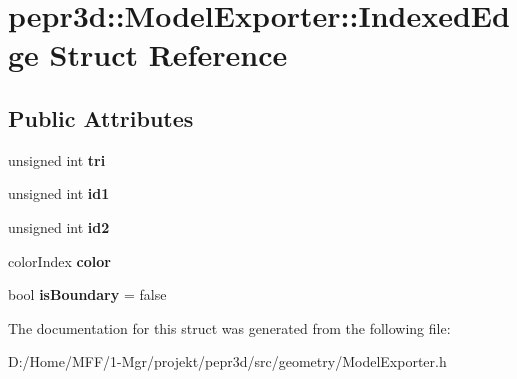 \hypertarget{structpepr3d_1_1_model_exporter_1_1_indexed_edge}{}\section{pepr3d\+::Model\+Exporter\+::Indexed\+Edge Struct Reference}
\label{structpepr3d_1_1_model_exporter_1_1_indexed_edge}
\subsection*{Public Attributes}
\begin{DoxyCompactItemize}
\item 
\mbox{\label{structpepr3d_1_1_model_exporter_1_1_indexed_edge_a96c2ac311bdefbdd05d3d440f6cb7aae}} 
unsigned int {\bfseries tri}
\item 
\mbox{\label{structpepr3d_1_1_model_exporter_1_1_indexed_edge_a6480f84ae4bf23063dcb133b03aac124}} 
unsigned int {\bfseries id1}
\item 
\mbox{\label{structpepr3d_1_1_model_exporter_1_1_indexed_edge_acc7a156af891555d2131eae033e18556}} 
unsigned int {\bfseries id2}
\item 
\mbox{\label{structpepr3d_1_1_model_exporter_1_1_indexed_edge_a696a80a83650f39fe9e12bfee08df746}} 
color\+Index {\bfseries color}
\item 
\mbox{\label{structpepr3d_1_1_model_exporter_1_1_indexed_edge_ac7a7dae103a447d85fa9074a1cd054b7}} 
bool {\bfseries is\+Boundary} = false
\end{DoxyCompactItemize}


The documentation for this struct was generated from the following file\+:\begin{DoxyCompactItemize}
\item 
D\+:/\+Home/\+M\+F\+F/1-\/\+Mgr/projekt/pepr3d/src/geometry/Model\+Exporter.\+h\end{DoxyCompactItemize}
